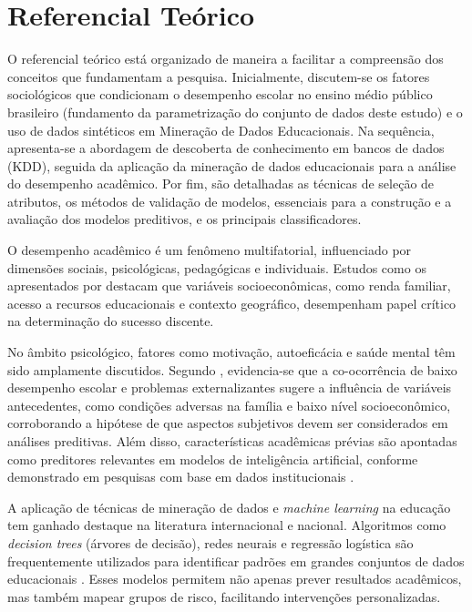\chapter{Referencial Teórico}

O referencial teórico está organizado de maneira a facilitar a compreensão dos conceitos que fundamentam a pesquisa. Inicialmente, discutem-se os fatores sociológicos que condicionam o desempenho escolar no ensino médio público brasileiro (fundamento da parametrização do conjunto de dados deste estudo) e o uso de dados sintéticos em Mineração de Dados Educacionais. Na sequência, apresenta-se a abordagem de descoberta de conhecimento em bancos de dados (KDD), seguida da aplicação da mineração de dados educacionais para a análise do desempenho acadêmico. Por fim, são detalhadas as técnicas de seleção de atributos, os métodos de validação de modelos, essenciais para a construção e a avaliação dos modelos preditivos, e os principais classificadores.

O desempenho acadêmico é um fenômeno multifatorial, influenciado por dimensões sociais, psicológicas, pedagógicas e individuais. Estudos como os apresentados por  destacam que variáveis socioeconômicas, como renda familiar, acesso a recursos educacionais e contexto geográfico, desempenham papel crítico na determinação do sucesso discente.

No âmbito psicológico, fatores como motivação, autoeficácia e saúde mental têm sido amplamente discutidos. Segundo , evidencia-se que a co-ocorrência de baixo desempenho escolar e problemas externalizantes sugere a influência de variáveis antecedentes, como condições adversas na família e baixo nível socioeconômico, corroborando a hipótese de que aspectos subjetivos devem ser considerados em análises preditivas. Além disso, características acadêmicas prévias são apontadas como preditores relevantes em modelos de inteligência artificial, conforme demonstrado em pesquisas com base em dados institucionais \cite{curi2006}.

A aplicação de técnicas de mineração de dados e \textit{machine learning} na educação tem ganhado destaque na literatura internacional e nacional. Algoritmos como \textit{decision trees} (árvores de decisão), redes neurais e regressão logística são frequentemente utilizados para identificar padrões em grandes conjuntos de dados educacionais \cite{baker2011}. Esses modelos permitem não apenas prever resultados acadêmicos, mas também mapear grupos de risco, facilitando intervenções personalizadas.

